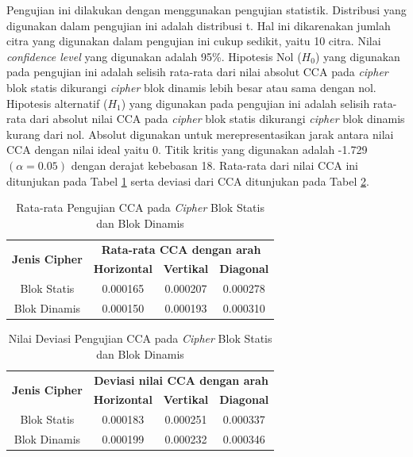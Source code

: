 Pengujian ini dilakukan dengan menggunakan pengujian statistik. Distribusi yang digunakan dalam pengujian ini adalah distribusi t. Hal ini dikarenakan jumlah citra yang digunakan dalam pengujian ini cukup sedikit, yaitu 10 citra. Nilai \emph{confidence level} yang digunakan adalah 95\%. Hipotesis Nol ($H_0$) yang digunakan pada pengujian ini adalah selisih rata-rata dari nilai absolut CCA pada \emph{cipher} blok statis dikurangi \emph{cipher} blok dinamis lebih besar atau sama dengan nol. Hipotesis alternatif ($H_1$) yang digunakan pada pengujian ini adalah selisih rata-rata dari absolut nilai CCA pada \emph{cipher} blok statis dikurangi \emph{cipher} blok dinamis kurang dari nol. Absolut digunakan untuk merepresentasikan jarak antara nilai CCA dengan nilai ideal yaitu 0. Titik kritis yang digunakan adalah -1.729 $(\alpha = 0.05)$ dengan derajat kebebasan 18. Rata-rata dari nilai CCA ini ditunjukan pada Tabel \ref{tab:test.cca} serta deviasi dari CCA ditunjukan pada Tabel \ref{tab:test.dev.cca}.

\begin{table}
  \centering
  \caption{Rata-rata Pengujian CCA pada \emph{Cipher} Blok Statis dan Blok Dinamis} \label{tab:test.cca}
  \begin{tabular}{|c|c|c|c|}
    \hline
    \multirow{2}{*}{\textbf{Jenis Cipher}} & \multicolumn{3}{c|}{\textbf{Rata-rata CCA dengan arah}} \\ \cline{2-4}
    & \textbf{Horizontal} & \textbf{Vertikal} & \textbf{Diagonal} \\ \hline
    Blok Statis & 0.000165 & 0.000207 & 0.000278 \\ \hline
    Blok Dinamis & 0.000150 & 0.000193 & 0.000310 \\ \hline
  \end{tabular}
\end{table}

\begin{table}
  \centering
  \caption{Nilai Deviasi Pengujian CCA pada \emph{Cipher} Blok Statis dan Blok Dinamis} \label{tab:test.dev.cca}
  \begin{tabular}{|c|c|c|c|}
    \hline
    \multirow{2}{*}{\textbf{Jenis Cipher}} & \multicolumn{3}{c|}{\textbf{Deviasi nilai CCA dengan arah}} \\ \cline{2-4}
    & \textbf{Horizontal} & \textbf{Vertikal} & \textbf{Diagonal} \\ \hline
    Blok Statis & 0.000183 & 0.000251 & 0.000337 \\ \hline
    Blok Dinamis & 0.000199 & 0.000232 & 0.000346 \\ \hline
  \end{tabular}
\end{table}

